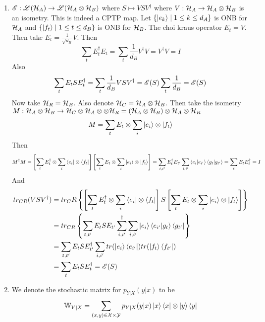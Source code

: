 \documentclass[a4paper, 11pt]{article}
\begin{document}
{\begin{enumerate}[label=(\arabic*)]
	\item ${\mathscr{E}}:{\mathscr{L}}(\mathcal{H}_A)\to {\mathscr{L}}(\mathcal{H}_A\otimes \mathcal{H}_B)$ where $S\mapsto VSV^{\dagger}$ where $V:\mathcal{H}_A\to\mathcal{H}_A\otimes \mathcal{H}_B$ is an isometry.  This is indeed a CPTP map.  Let $\{\ket{e_k}\mid 1\leq k\leq d_A\}$ is ONB for $\mathcal{H}_A$ and $\{\ket{f_t}\mid 1\leq t\leq d_B\}$ is ONB for $\mathcal{H}_B$. The choi kraus operator $E_t=V$. Then take $E_t=\frac1{\sqrt{d_B}}V$. Then $$\sum_{t}E_t^{\dagger}E_t=\sum_t\frac1{d_B}V^{\dagger}V=V^{\dagger}V=I$$Also $$\sum_tE_tSE_t^{\dagger}=\sum_t\frac1{d_B}VSV^{\dagger}={\mathscr{E}}(S)\sum_t\frac1{d_B}={\mathscr{E}}(S)$$Now take $\mathcal{H}_R=\mathcal{H}_B$. Also denote $\mathcal{H}_C=\mathcal{H}_A\otimes \mathcal{H}_B$.  Then take the isometry $M:\mathcal{H}_A\otimes \mathcal{H}_B\to \mathcal{H}_C\otimes \mathcal{H}_A\otimes \otimes \mathcal{H}_R=(\mathcal{H}_A\otimes \mathcal{H}_B)\otimes \mathcal{H}_A\otimes \mathcal{H}_R$ $$M=\sum_tE_t\otimes \sum_i\ket{e_i}\otimes \ket{f_t}$$Then $$M^{\dagger}M=\left[ \sum_tE_t^{\dagger}\otimes \sum_i\bra{e_i}\otimes \bra{f_t} \right]\left[\sum_tE_t\otimes \sum_i\ket{e_i}\otimes \ket{f_t}  \right]=\sum_{t,t'}E_t^{\dagger}E_{t'}\sum_{i,i'}\bra{e_i}\ket{e_{i'}}\bra{g_t}\ket{g_{t'}}=\sum_tE_tE_t^{\dagger}=I$$And\begin{align*}
			tr_{CR}(VSV^{\dagger}) & = tr_CR\left\{\left[ \sum_tE_t^{\dagger}\otimes \sum_i\bra{e_i}\otimes \bra{f_t} \right]S\left[\sum_tE_t\otimes \sum_i\ket{e_i}\otimes \ket{f_t}  \right]   \right\}\\
			& = tr_{CR}\left\{   \sum_{t,t'}E_tSE_{t'}\sum_{i,i'}^{\dagger}\sum_{i,i'}\ket{e_i}\bra{e_{i'}}\ket{g_t}\bra{g_{t'}}  \right\}\\
			& = \sum_{t,t'} E_tSE_{t'}^{\dagger}\sum_{i,i'}tr(\ket{e_i}\bra{e_{i'}}) tr(\ket{f_t}\bra{f_{t'}})\\
			& = \sum_tE_tSE_t^{\dagger}={\mathscr{E}}(S)
	\end{align*}
	\item We denote the stochastic matrix for $p_{Y|X}(y|x)$ to be $$\mathbb{W}_{Y|X}=\sum\limits_{(x,y)\in\mathcal{X}\times \mathcal{Y}}p_{Y|X}(y|x)\ket{x}\bra{x}\otimes \ket{y}\bra{y}$$
	
	
	

\end{enumerate}}
\end{document}

